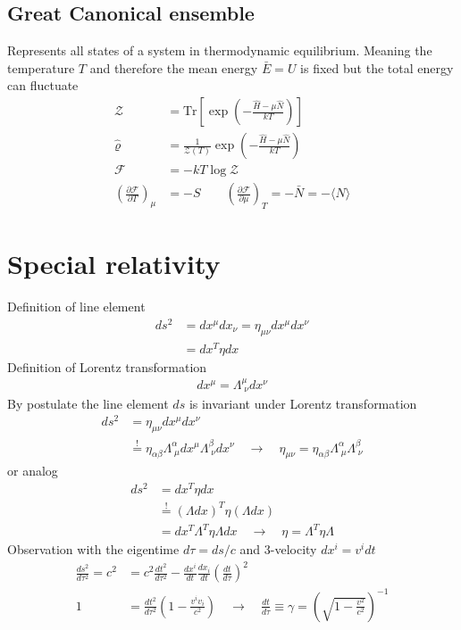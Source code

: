 \documentclass[../main.tex]{subfiles}
\begin{document}
\subsection{Great Canonical ensemble}
Represents all states of a system in thermodynamic equilibrium. Meaning the temperature $T$ and therefore the mean energy $\bar{E}=U$ is fixed but the total energy can fluctuate
\begin{align}
\mathcal{Z}&=\text{Tr}\left[\exp\left(-\frac{\hat{H}-\mu\hat{N}}{kT}\right)\right]\\
\hat{\varrho}&=\frac{1}{\mathcal{Z}(T)}\exp\left(-\frac{\hat{H}-\mu\hat{N}}{kT}\right)\\
\mathcal{F}&=-kT\log \mathcal{Z}\\
\left(\frac{\partial \mathcal{F}}{\partial T}\right)_\mu&=-S
\qquad
\left(\frac{\partial \mathcal{F}}{\partial\mu}\right)_T=-\bar{N}=-\langle\hat{N}\rangle
\end{align}




\section{Special relativity}
Definition of line element
\begin{align}
    ds^2 &= dx^\mu dx_\nu = \eta_{\mu\nu}dx^\mu dx^\nu\\
        &= dx^T\eta dx
\end{align}
Definition of Lorentz transformation
\begin{align}
    dx^\mu = \Lambda^\mu_{\;\nu}dx^\nu
\end{align}
By postulate the line element $ds$ is invariant under Lorentz transformation
\begin{align}
    ds^2 &= \eta_{\mu\nu}dx^\mu dx^\nu\\
    &\stackrel{!}{=} \eta_{\alpha\beta}\Lambda^\alpha_{\;\mu}dx^\mu \Lambda^\beta_{\;\nu}dx^\nu\quad\rightarrow\quad \eta_{\mu\nu} = \eta_{\alpha\beta}\Lambda^\alpha_{\;\mu} \Lambda^\beta_{\;\nu}
\end{align}
or analog
\begin{align}
    ds^2 &= dx^T\eta dx\\
    &\stackrel{!}{=} (\Lambda dx)^T\eta (\Lambda dx)\\
    &= dx^T\Lambda^T\eta \Lambda dx\quad\rightarrow\quad \eta = \Lambda^T\eta\Lambda
\end{align}
Observation with the eigentime $d\tau=ds/c$ and 3-velocity $dx^i = v^i dt$
\begin{align}
    \frac{ds^2}{d\tau^2}=c^2&=c^2\frac{dt^2}{d\tau^2}-\frac{dx^i}{dt}\frac{dx_i}{dt}\left(\frac{dt}{d\tau}\right)^2\\
    1&=\frac{dt^2}{d\tau^2}\left(1-\frac{v^iv_i}{c^2}\right)\quad\rightarrow\quad\frac{dt}{d\tau}\equiv\gamma=\left(\sqrt{1-\frac{v^2}{c^2}}\right)^{-1}
\end{align}
\end{document}
